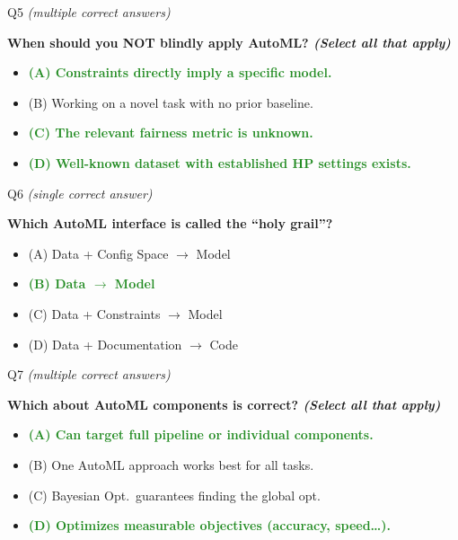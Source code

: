 \documentclass[main]{subfiles}
\newcommand{\correct}[1]{\textcolor{ForestGreen}{\textbf{#1} \checkmark}}
\newcommand{\wrong}[1]{#1}
\begin{document}
\begin{frame}{Q5 \hfill \small\normalfont\textit{(multiple correct answers)}}

\textbf{When should you NOT blindly apply AutoML? \textit{(Select all that apply)}}

\begin{itemize}
    \item \correct{(A) \; Constraints directly imply a specific model.}
    \item \wrong{(B) \; Working on a novel task with no prior baseline.}
    \item \correct{(C) \; The relevant fairness metric is unknown.}
    \item \correct{(D) \; Well-known dataset with established HP settings exists.}
\end{itemize}

\end{frame}

\begin{frame}{Q6 \hfill \small\normalfont\textit{(single correct answer)}}

\textbf{Which AutoML interface is called the ``holy grail''?}

\begin{itemize}
    \item \wrong{(A) \; Data + Config Space $\to$ Model}
    \item \correct{(B) \; Data $\to$ Model}
    \item \wrong{(C) \; Data + Constraints $\to$ Model}
    \item \wrong{(D) \; Data + Documentation $\to$ Code}
\end{itemize}

\end{frame}

\begin{frame}{Q7 \hfill \small\normalfont\textit{(multiple correct answers)}}

\textbf{Which about AutoML components is correct? \textit{(Select all that apply)}}

\begin{itemize}
    \item \correct{(A) \; Can target full pipeline or individual components.}
    \item \wrong{(B) \; One AutoML approach works best for all tasks.}
    \item \wrong{(C) \; Bayesian Opt.\ guarantees finding the global opt.}
    \item \correct{(D) \; Optimizes measurable objectives (accuracy, speed\ldots).}
\end{itemize}

\end{frame}
\end{document}
